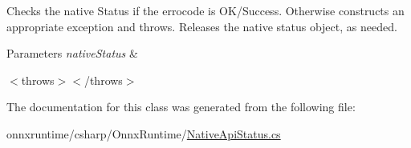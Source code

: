 Checks the native Status if the errocode is O\+K/\+Success. Otherwise constructs an appropriate exception and throws. Releases the native status object, as needed. 


\begin{DoxyParams}{Parameters}
{\em native\+Status} & \\
\hline
\end{DoxyParams}
$<$throws$>$$<$/throws$>$ 

The documentation for this class was generated from the following file\+:\begin{DoxyCompactItemize}
\item 
onnxruntime/csharp/\+Onnx\+Runtime/\mbox{\hyperlink{NativeApiStatus_8cs}{Native\+Api\+Status.\+cs}}\end{DoxyCompactItemize}
